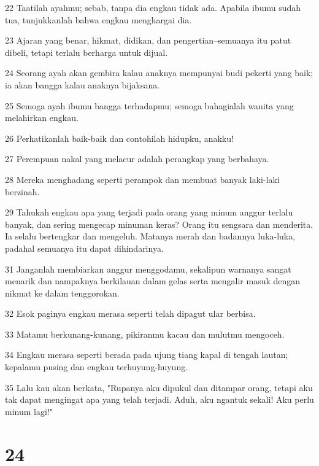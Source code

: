 \par 22 Taatilah ayahmu; sebab, tanpa dia engkau tidak ada. Apabila ibumu sudah tua, tunjukkanlah bahwa engkau menghargai dia.
\par 23 Ajaran yang benar, hikmat, didikan, dan pengertian--semuanya itu patut dibeli, tetapi terlalu berharga untuk dijual.
\par 24 Seorang ayah akan gembira kalau anaknya mempunyai budi pekerti yang baik; ia akan bangga kalau anaknya bijaksana.
\par 25 Semoga ayah ibumu bangga terhadapmu; semoga bahagialah wanita yang melahirkan engkau.
\par 26 Perhatikanlah baik-baik dan contohilah hidupku, anakku!
\par 27 Perempuan nakal yang melacur adalah perangkap yang berbahaya.
\par 28 Mereka menghadang seperti perampok dan membuat banyak laki-laki berzinah.
\par 29 Tahukah engkau apa yang terjadi pada orang yang minum anggur terlalu banyak, dan sering mengecap minuman keras? Orang itu sengsara dan menderita. Ia selalu bertengkar dan mengeluh. Matanya merah dan badannya luka-luka, padahal semuanya itu dapat dihindarinya.
\par 31 Janganlah membiarkan anggur menggodamu, sekalipun warnanya sangat menarik dan nampaknya berkilauan dalam gelas serta mengalir masuk dengan nikmat ke dalam tenggorokan.
\par 32 Esok paginya engkau merasa seperti telah dipagut ular berbisa.
\par 33 Matamu berkunang-kunang, pikiranmu kacau dan mulutmu mengoceh.
\par 34 Engkau merasa seperti berada pada ujung tiang kapal di tengah lautan; kepalamu pusing dan engkau terhuyung-huyung.
\par 35 Lalu kau akan berkata, "Rupanya aku dipukul dan ditampar orang, tetapi aku tak dapat mengingat apa yang telah terjadi. Aduh, aku ngantuk sekali! Aku perlu minum lagi!"

\chapter{24}

